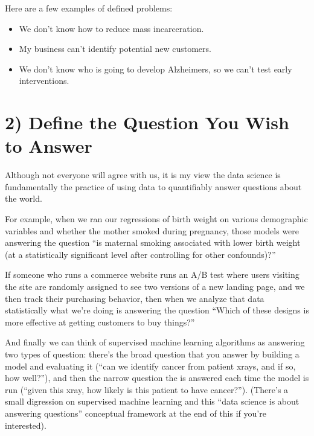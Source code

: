 \documentclass[letterpaper,10pt,english]{jupyterBook}
\begin{document}
\sphinxAtStartPar
Here are a few examples of defined problems:
\begin{itemize}
\item {} 
\sphinxAtStartPar
We don’t know how to reduce mass incarceration.

\item {} 
\sphinxAtStartPar
My business can’t identify potential new customers.

\item {} 
\sphinxAtStartPar
We don’t know who is going to develop Alzheimers, so we can’t test early interventions.

\end{itemize}


\section{2) Define the Question You Wish to Answer}
\label{\detokenize{40_in_practice/05_backwards_design:define-the-question-you-wish-to-answer}}
\sphinxAtStartPar
Although not everyone will agree with us, it is my view the data science is fundamentally the practice of using data to quantifiably answer questions about the world.

\sphinxAtStartPar
For example, when we ran our regressions of birth weight on various demographic variables and whether the mother smoked during pregnancy, those models were answering the question “is maternal smoking associated with lower birth weight (at a statistically significant level after controlling for other confounds)?”

\sphinxAtStartPar
If someone who runs a commerce website runs an A/B test where users visiting the site are randomly assigned to see two versions of a new landing page, and we then track their purchasing behavior, then when we analyze that data statistically what we’re doing is answering the question “Which of these designs is more effective at getting customers to buy things?”

\sphinxAtStartPar
And finally we can think of supervised machine learning algorithms as answering two types of question: there’s the broad question that you answer by building a model and evaluating it (“can we identify cancer from patient x\sphinxhyphen{}rays, and if so, how well?”), and then the narrow question the is answered each time the model is run (“given this x\sphinxhyphen{}ray, how likely is this patient to have cancer?”). (There’s a small digression on supervised machine learning and this “data science is about answering questions” conceptual framework at the end of this if you’re interested).
\end{document}
